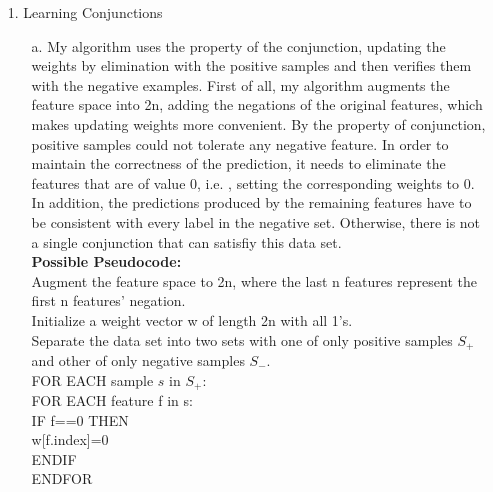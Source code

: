 
\usepackage{graphicx}
\graphicspath{{pic/}}
\oddsidemargin 0in
\evensidemargin 0in
\textwidth 6.5in
\topmargin -0.5in
\textheight 9.0in




\pagestyle{myheadings}  %

\begin{enumerate}
	\item[1.]Learning Conjunctions
	\begin{enumerate}
		\item[a.] My algorithm uses the property of the conjunction, updating the weights by elimination with the positive samples and then verifies them with the negative examples. First of all, my algorithm augments the feature space into 2n, adding the negations of the original features, which makes updating weights more convenient. By the property of conjunction, positive samples could not tolerate any negative feature. In order to maintain the correctness of the prediction, it needs to eliminate the features that are of value 0, i.e. , setting the corresponding weights to 0. In addition, the predictions produced by the remaining features have to be consistent with every label in the negative set. Otherwise, there is not a single conjunction that can satisfiy this data set.\\
		\textbf {Possible Pseudocode:}\\
		Augment the feature space to 2n, where the last n features represent the first n features' negation.\\
		Initialize a weight vector w of length 2n with all 1's.\\
		Separate the data set into two sets with one of only positive samples \(S_+\) and other of only negative samples \(S_-\).\\
		FOR EACH sample \(s\) in \(S_+\):\\
	    \hspace*{5 mm} FOR EACH feature f in s:\\
	    \hspace*{10 mm} IF f==0 THEN\\
	    \hspace*{15 mm} w[f.index]=0\\
	    \hspace*{10 mm}	ENDIF\\
	    \hspace*{5 mm} ENDFOR\\

\end{enumerate}
\end{enumerate}
